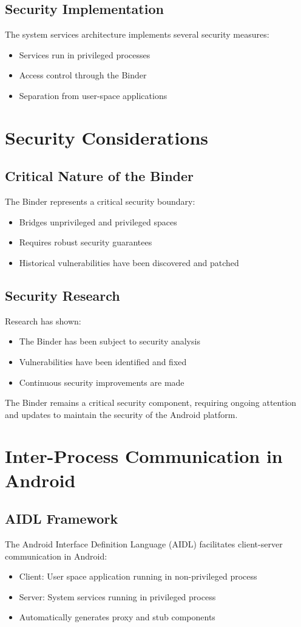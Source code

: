\documentclass{article}
\begin{document}
\subsection{Security Implementation}
The system services architecture implements several security measures:
\begin{itemize}
    \item Services run in privileged processes
    \item Access control through the Binder
    \item Separation from user-space applications
\end{itemize}

\section{Security Considerations}
\subsection{Critical Nature of the Binder}
The Binder represents a critical security boundary:
\begin{itemize}
    \item Bridges unprivileged and privileged spaces
    \item Requires robust security guarantees
    \item Historical vulnerabilities have been discovered and patched
\end{itemize}

\subsection{Security Research}
Research has shown:
\begin{itemize}
    \item The Binder has been subject to security analysis
    \item Vulnerabilities have been identified and fixed
    \item Continuous security improvements are made
\end{itemize}

The Binder remains a critical security component, requiring ongoing attention and updates to maintain the security of the Android platform.
\section{Inter-Process Communication in Android}
\subsection{AIDL Framework}
The Android Interface Definition Language (AIDL) facilitates client-server communication in Android:
\begin{itemize}
    \item Client: User space application running in non-privileged process
    \item Server: System services running in privileged process
    \item Automatically generates proxy and stub components
\end{itemize}
\end{document}
